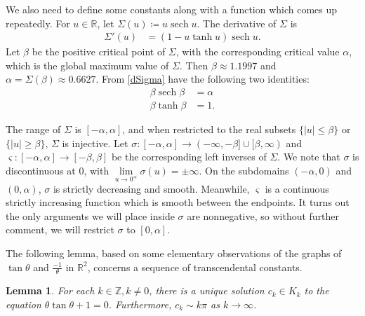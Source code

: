 \documentclass{amsart}
\theoremstyle{plain}
\numberwithin{theorem}{section}
\newtheorem{lemma}[theorem]{Lemma}
\DeclareMathOperator{\sech}{sech}
\theoremstyle{definition}
\theoremstyle{remark}
\theoremstyle{brakets}
\newcommand{\R}{\mathbb{R}}
\newcommand{\Z}{\mathbb{Z}}
\begin{document}
We also need to define some constants along with a function which comes up repeatedly. For $u \in \R$, let $\Sigma(u) \coloneq u\sech u$. The derivative of $\Sigma$ is
\begin{align}
\Sigma'(u) &= (1 - u\tanh u)\sech u . \label{dSigma}
\end{align}
\noindent Let $\beta$ be the positive critical point of $\Sigma$, with the corresponding critical value $\alpha$, which is the global maximum value of $\Sigma$. Then $\beta \approx 1.1997$ and $\alpha = \Sigma(\beta) \approx 0.6627$. From \eqref{dSigma} have the following two identities:
\begin{subequations}
\label{alphabeta}
\begin{align}
\beta \sech \beta &= \alpha \label{bsechba} \\ 
\beta \tanh \beta &= 1. \label{btanhb1}
\end{align}
\end{subequations}

The range of $\Sigma$ is $[-\alpha,\alpha]$, and when restricted to the real subsets $\{|u| \leq \beta\}$ or $\{|u| \geq \beta\}$, $\Sigma$ is injective. Let $\sigma:[-\alpha,\alpha] \to (-\infty,-\beta] \cup [\beta, \infty)$ and $\varsigma:[-\alpha,\alpha] \to [-\beta,\beta]$ be the corresponding left inverses of $\Sigma$. We note that $\sigma$ is discontinuous at $0$, with $\lim\limits_{u \to 0^{\mp}} \sigma(u) = \pm \infty$. On the subdomains $(-\alpha,0)$ and $(0,\alpha)$, $\sigma$ is strictly decreasing and smooth. Meanwhile, $\varsigma$ is a continuous strictly increasing function which is smooth between the endpoints. It turns out the only arguments we will place inside $\sigma$ are nonnegative, so without further comment, we will restrict $\sigma$ to $[0,\alpha]$.


The following lemma, based on some elementary observations of the graphs of $\tan \theta$ and $\frac{-1}{\theta}$ in $\R^2$, concerns a sequence of transcendental constants.
\begin{lemma}
\label{xtanx}
For each $k \in \Z, k \neq 0$, there is a unique solution $c_k \in K_k$ to the equation $\theta\tan \theta + 1 =0$. Furthermore, $c_k \sim k\pi$ as $k \to \infty$.
\end{lemma}
\end{document}

